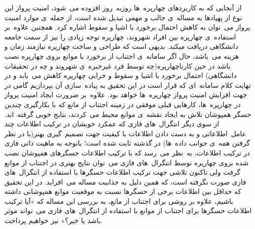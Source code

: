 از آنجایی که به کاربردهای چهارپره\ ها روزبه\ روز افزوده می\ شود، امنیت پرواز این نوع از پهپادها به مساله\ ی جالب و مهمی تبدیل شده است، از جمله\ ی موارد امنیت پرواز می\ توان به کاهش احتمال برخورد با اشیا و سقوط اشاره کرد. همچنین علاوه\ بر استفاده\ ی  چهارپره بین افراد شهروند، چهارپره توجه زیادی را نیز از سمت جامعه دانشگاهی دریافت میکند. بدیهی است که طراحی و ساخت چهارپره نیازمند زمان و هزینه می\ باشد، حال اگر سامانه\ ی اجتناب از برخورد با موانع بروی چهارپره نصب باشد در حین کارباچهارپره(چه توسط فرد غیرخبره\ ی شهروند و چه در تحقیقات دانشگاهی) احتمال برخورد با اشیا و سقوط و خرابی چهارپره کاهش می\ یابد و در نهایت کلام سامانه\ ای که قرار است در این تحقیق به پیاده\ سازی آن بپردازیم گامی در جهت افزایش امنیت پرواز چهارپره\ ها خواهد بود.
علاوه\ بر ضرورت ایجاد امنیت پرواز در چهارپره\ ها، کارهایی قبلی موفقی در زمینه اجتناب از مانع که با بکارگیری چندین حسگر همپوشان تلاش به ایجاد نقشه\ ی موانع محیط می\ کردند، نتایج خوبی گرفته\ اند. از سوی دیگر انتگرال\ های فازی که عمکرد خوبشان در ترکیب اطلاعات چند عامل\ اطلاعاتی و به دست دادن اطلاعات با کیفیت جهت تصمیم\ گیری بهتر(با در نظر گرفتن همه\ ی جوانب داده\ ها) در گذشته ثابت شده است؛ باتوجه به ماهیت ذاتی  فازی در ترکیب اطلاعات، به\ نظر می\ رسد که با ترکیب اطلاعات حسگرهای همپوشان نصب شده بروی چهارپره توسط انتگرال\ های فازی می\ توان نتایج بهتری در اجتناب از موانع گرفت ولی تاکنون تلاشی جهت ترکیب اطلاعات حسگرها با استفاده از انتگرال\ های فازی صورت نگرفته است، که همین دلیل به جذابیت مساله می\ افزاید. در این تحقیق  که حداقل بین اطلاعات برخی از حسگرها نسبت به موقعیت موانع همپوشانی داشته باشیم، علاوه بر  روشی برای اجتناب از مانع، به بررسی این مساله که «آیا ترکیب اطلاعات حسگرها برای اجتناب از موانع با استفاده از انتگرال\ های فازی می\ تواند موثر باشد یا خیر؟» نیز خواهیم پرداخت.